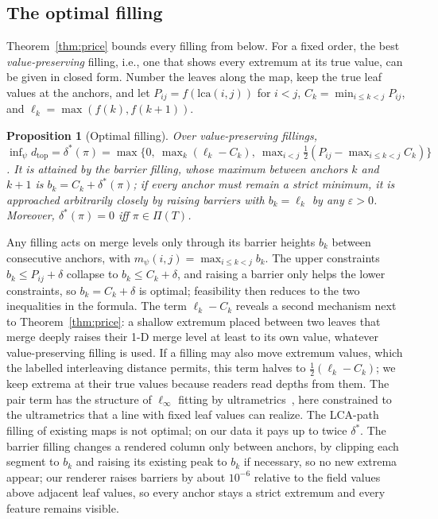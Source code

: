 \documentclass[review]{vgtc}                 %
\newtheorem{proposition}[theorem]{Proposition}
\newcommand{\dtop}{d_{\mathrm{top}}}
\newcommand{\lca}{\mathrm{lca}}
\begin{document}
\subsection{The optimal filling}
Theorem~\ref{thm:price} bounds every filling from below. For a fixed order, the best \emph{value-preserving} filling, i.e., one that shows every extremum at its true value, can be given in closed form. Number the leaves along the map, keep the true leaf values at the anchors, and let $P_{ij}=f(\lca(i,j))$ for $i<j$, $C_k=\min_{i\le k<j}P_{ij}$, and $\ell_k=\max(f(k),f(k+1))$.

\begin{proposition}[Optimal filling]\label{prop:fill}
Over value-preserving fillings, $\inf_\psi\dtop=\delta^*(\pi)=\max\{0,\ \max_k(\ell_k-C_k),\ \max_{i<j}\frac12(P_{ij}-\max_{i\le k<j}C_k)\}$. It is attained by the \emph{barrier filling}, whose maximum between anchors $k$ and $k+1$ is $b_k=C_k+\delta^*(\pi)$; if every anchor must remain a strict minimum, it is approached arbitrarily closely by raising barriers with $b_k=\ell_k$ by any $\varepsilon>0$. Moreover, $\delta^*(\pi)=0$ iff $\pi\in\Pi(T)$.
\end{proposition}
Any filling acts on merge levels only through its barrier heights $b_k$ between consecutive anchors, with $m_\psi(i,j)=\max_{i\le k<j}b_k$. The upper constraints $b_k\le P_{ij}+\delta$ collapse to $b_k\le C_k+\delta$, and raising a barrier only helps the lower constraints, so $b_k=C_k+\delta$ is optimal; feasibility then reduces to the two inequalities in the formula. The term $\ell_k-C_k$ reveals a second mechanism next to Theorem~\ref{thm:price}: a shallow extremum placed between two leaves that merge deeply raises their 1-D merge level at least to its own value, whatever value-preserving filling is used. If a filling may also move extremum values, which the labelled interleaving distance permits, this term halves to $\frac12(\ell_k-C_k)$; we keep extrema at their true values because readers read depths from them. The pair term has the structure of $\ell_\infty$ fitting by ultrametrics~\cite{Farach:1995:RM,Chepoi:2000:LIA}, here constrained to the ultrametrics that a line with fixed leaf values can realize. The LCA-path filling of existing maps is not optimal; on our data it pays up to twice $\delta^*$. The barrier filling changes a rendered column only between anchors, by clipping each segment to $b_k$ and raising its existing peak to $b_k$ if necessary, so no new extrema appear; our renderer raises barriers by about $10^{-6}$ relative to the field values above adjacent leaf values, so every anchor stays a strict extremum and every feature remains visible.
\end{document}
